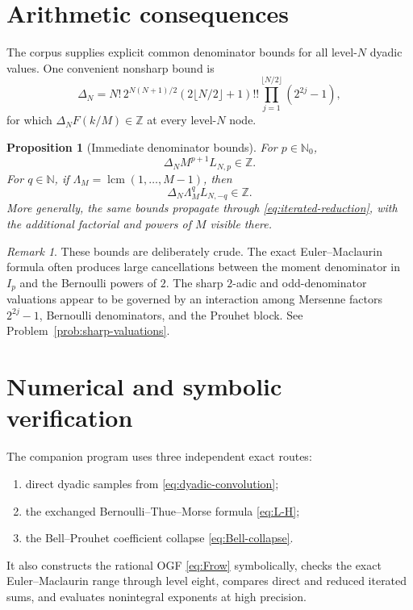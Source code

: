 \documentclass[11pt,oneside]{article}
\numberwithin{equation}{section}
\newtheorem{proposition}[theorem]{Proposition}
\theoremstyle{definition}
\theoremstyle{remark}
\newtheorem{remark}[theorem]{Remark}
\newcommand{\N}{\mathbb N}
\newcommand{\Z}{\mathbb Z}
\begin{document}
\section{Arithmetic consequences}
\label{sec:arithmetic}

The corpus supplies explicit common denominator bounds for all level-\(N\) dyadic values.
One convenient nonsharp bound is
\begin{equation}
 \Delta_N
 =N!\,2^{N(N+1)/2}
 (2\lfloor N/2\rfloor+1)!!
 \prod_{j=1}^{\lfloor N/2\rfloor}(2^{2j}-1),
 \label{eq:DeltaN}
\end{equation}
for which
\(
 \Delta_NF(k/M)\in\Z
\) at every level-\(N\) node.

\begin{proposition}[Immediate denominator bounds]
\label{prop:denominator-bounds}
For \(p\in\N_0\),
\begin{equation}
 \Delta_NM^{p+1}L_{N,p}\in\Z.
 \label{eq:denom-positive}
\end{equation}
For \(q\in\N\), if
\(
 \Lambda_M=\operatorname{lcm}(1,\ldots,M-1)
\), then
\begin{equation}
 \Delta_N\Lambda_M^qL_{N,-q}\in\Z.
 \label{eq:denom-negative}
\end{equation}
More generally, the same bounds propagate through
\eqref{eq:iterated-reduction}, with the additional factorial and powers of \(M\) visible
there.
\end{proposition}

\begin{remark}
These bounds are deliberately crude.  The exact Euler--Maclaurin formula often produces
large cancellations between the moment denominator in \(I_p\) and the Bernoulli powers
of \(2\).  The sharp \(2\)-adic and odd-denominator valuations appear to be governed by
an interaction among Mersenne factors \(2^{2j}-1\), Bernoulli denominators, and the
Prouhet block.  See Problem~\ref{prob:sharp-valuations}.
\end{remark}

\section{Numerical and symbolic verification}
\label{sec:experiments}

The companion program  uses three independent exact
routes:
\begin{enumerate}
\item direct dyadic samples from \eqref{eq:dyadic-convolution};
\item the exchanged Bernoulli--Thue--Morse formula \eqref{eq:L-H};
\item the Bell--Prouhet coefficient collapse \eqref{eq:Bell-collapse}.
\end{enumerate}
It also constructs the rational OGF \eqref{eq:Frow} symbolically, checks the exact
Euler--Maclaurin range through level eight, compares direct and reduced iterated sums,
and evaluates nonintegral exponents at high precision.
\end{document}
